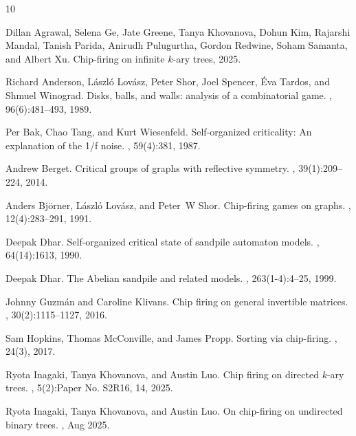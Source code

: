\documentclass[11pt]{article}
\theoremstyle{remark}
\theoremstyle{definition}
\begin{document}
\begin{thebibliography}{10}

Dillan Agrawal, Selena Ge, Jate Greene, Tanya Khovanova, Dohun Kim, Rajarshi Mandal, Tanish Parida, Anirudh Pulugurtha, Gordon Redwine, Soham Samanta, and Albert Xu.
\newblock Chip-firing on infinite $k$-ary trees, 2025.

Richard Anderson, L{\'a}szl{\'o} Lov{\'a}sz, Peter Shor, Joel Spencer, {\'E}va Tardos, and Shmuel Winograd.
\newblock Disks, balls, and walls: analysis of a combinatorial game.
, 96(6):481--493, 1989.

Per Bak, Chao Tang, and Kurt Wiesenfeld.
\newblock Self-organized criticality: An explanation of the 1/f noise.
, 59(4):381, 1987.

Andrew Berget.
\newblock Critical groups of graphs with reflective symmetry.
, 39(1):209--224, 2014.

Anders Bj{\"o}rner, L{\'a}szl{\'o} Lov{\'a}sz, and Peter~W Shor.
\newblock Chip-firing games on graphs.
, 12(4):283--291, 1991.

Deepak Dhar.
\newblock Self-organized critical state of sandpile automaton models.
, 64(14):1613, 1990.

Deepak Dhar.
\newblock The {A}belian sandpile and related models.
, 263(1-4):4--25, 1999.

Johnny Guzm{\'a}n and Caroline Klivans.
\newblock Chip firing on general invertible matrices.
, 30(2):1115--1127, 2016.

Sam Hopkins, Thomas McConville, and James Propp.
\newblock Sorting via chip-firing.
, 24(3), 2017.

Ryota Inagaki, Tanya Khovanova, and Austin Luo.
\newblock Chip firing on directed {$k$}-ary trees.
, 5(2):Paper No. S2R16, 14, 2025.

Ryota Inagaki, Tanya Khovanova, and Austin Luo.
\newblock On chip-firing on undirected binary trees.
, Aug 2025.


\end{thebibliography}
\end{document}
